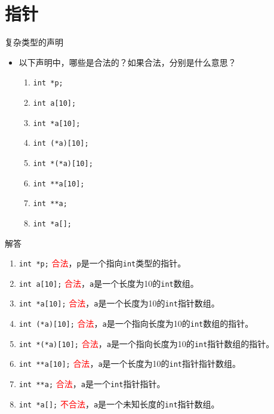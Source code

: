 \documentclass{beamer}
\begin{document}
\section{指针}
\begin{frame}{复杂类型的声明}
    \begin{itemize}
        \item 以下声明中，哪些是合法的？如果合法，分别是什么意思？
        \begin{enumerate}[A]
            \item \texttt{int *p;}
            \item \texttt{int a[10];}
            \item \texttt{int *a[10];}
            \item \texttt{int (*a)[10];}
            \item \texttt{int *(*a)[10];}
            \item \texttt{int **a[10];}
            \item \texttt{int **a;}
            \item \texttt{int *a[];}
        \end{enumerate}
    \end{itemize}
\end{frame}

\begin{frame}{解答}
    \begin{enumerate}[A]
        \item \texttt{int *p;} \quad \textcolor{red}{合法}，\texttt{p}是一个指向\texttt{int}类型的指针。
        \item \texttt{int a[10];} \quad \textcolor{red}{合法}，\texttt{a}是一个长度为10的\texttt{int}数组。
        \item \texttt{int *a[10];} \quad \textcolor{red}{合法}，\texttt{a}是一个长度为10的\texttt{int}指针数组。
        \item \texttt{int (*a)[10];} \quad \textcolor{red}{合法}，\texttt{a}是一个指向长度为10的\texttt{int}数组的指针。
        \item \texttt{int *(*a)[10];} \quad \textcolor{red}{合法}，\texttt{a}是一个指向长度为10的\texttt{int}指针数组的指针。
        \item \texttt{int **a[10];} \quad \textcolor{red}{合法}，\texttt{a}是一个长度为10的\texttt{int}指针指针数组。
        \item \texttt{int **a;} \quad \textcolor{red}{合法}，\texttt{a}是一个\texttt{int}指针指针。
        \item \texttt{int *a[];} \quad \textcolor{red}{不合法}，\texttt{a}是一个未知长度的\texttt{int}指针数组。
    \end{enumerate}
\end{frame}
\end{document}

